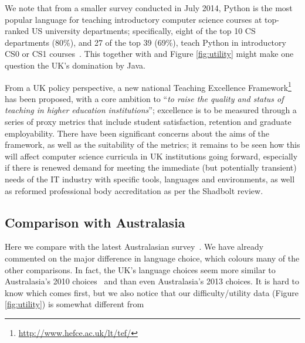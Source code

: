 \documentclass{sig-alternate}
\begin{document}
We note that from a smaller survey conducted in July 2014, Python is
the most popular language for teaching introductory computer science
courses at top-ranked US university departments; specifically, eight
of the top 10 CS departments (80\%), and 27 of the top 39 (69\%),
teach Python in introductory CS0 or CS1 courses~\cite{guo:2014}.  This
together with \cite{mason+cooper:2014} and Figure \ref{fig:utility}
might make one question the UK's domination by Java.

From a UK policy perspective, a new national Teaching Excellence
Framework\footnote{\url{http://www.hefce.ac.uk/lt/tef/}} has been
proposed, with a core ambition to ``{\emph{to raise the quality and
status of teaching in higher education institutions}}''; excellence is
to be measured through a series of proxy metrics that include student
satisfaction, retention and graduate employability. There have been
significant concerns about the aims of the framework, as well as the
suitability of the metrics; it remains to be seen how this will affect
computer science curricula in UK institutions going forward,
especially if there is renewed demand for meeting the immediate (but
potentially transient) needs of the IT industry with specific tools,
languages and environments, as well as reformed professional body
accreditation as per the Shadbolt review.



\subsection{Comparison with Australasia}

Here we compare with the latest Australasian
survey~\cite{mason+cooper:2014}. We have already commented on the
major difference in language choice, which colours many of the other
comparisons. In fact, the UK's language choices seem more similar to
Australasia's 2010 choices~\cite{mason-et-al:2012} and \cite[Table
4]{mason+cooper:2014} than even Australasia's 2013 choices. It is hard
to know which comes first, but we also notice that our
difficulty/utility data (Figure \ref{fig:utility}) is somewhat
different from \cite[Figures 7/8]{mason+cooper:2014}
\end{document}
